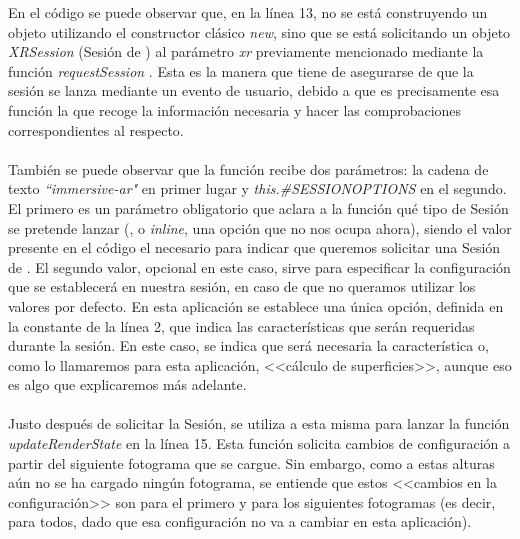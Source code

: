 \documentclass{subfiles}
\begin{document}
        En el código se puede observar que, en la línea 13, no se está construyendo un objeto utilizando el constructor clásico \textit{new}, sino que se está solicitando un objeto \textit{XRSession} (Sesión de \webxr) al parámetro \textit{xr} previamente mencionado mediante la función \textit{requestSession} \cite{web:requestsession}. Esta es la manera que tiene \webxr de asegurarse de que la sesión se lanza mediante un evento de usuario, debido a que es precisamente esa función la que recoge la información necesaria y hacer las comprobaciones correspondientes al respecto.

        \paragraph{}
        También se puede observar que la función recibe dos parámetros: la cadena de texto \textit{``immersive-ar"} en primer lugar y \textit{this.\#SESSIONOPTIONS} en el segundo. El primero es un parámetro obligatorio que aclara a la función qué tipo de Sesión se pretende lanzar (\ra, \rv o \textit{inline}, una opción que no nos ocupa ahora), siendo el valor presente en el código el necesario para indicar que queremos solicitar una Sesión de \ra. El segundo valor, opcional en este caso, sirve para especificar la configuración que se establecerá en nuestra sesión, en caso de que no queramos utilizar los valores por defecto. En esta aplicación se establece una única opción, definida en la constante de la línea 2, que indica las características que serán requeridas durante la sesión. En este caso, se indica que será necesaria la característica \hittest o, como lo llamaremos para esta aplicación, <<cálculo de superficies>>, aunque eso es algo que explicaremos más adelante.

        \paragraph{}
        Justo después de solicitar la Sesión, se utiliza a esta misma para lanzar la función \textit{updateRenderState} \cite{web:updaterenderstate} en la línea 15. Esta función solicita cambios de configuración a partir del siguiente fotograma que se cargue. Sin embargo, como a estas alturas aún no se ha cargado ningún fotograma, se entiende que estos <<cambios en la configuración>> son para el primero y para los siguientes fotogramas (es decir, para todos, dado que esa configuración no va a cambiar en esta aplicación).
\end{document}
